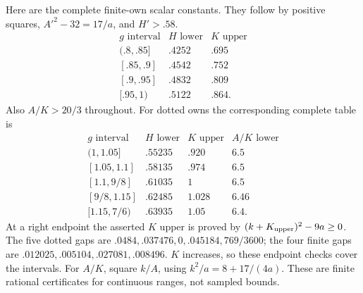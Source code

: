 \documentclass[11pt]{article}
\theoremstyle{definition}
\theoremstyle{remark}
\begin{document}
Here are the complete finite-own scalar constants.
They follow by positive squares, \(A'^2-32=17/a\), and
\(H'>.58\).
\[
\begin{array}{c|c|c}
g\text{ interval}&H\text{ lower}&K\text{ upper}\\ \hline
(.8,.85]&.4252&.695\\
{}[.85,.9]&.4542&.752\\
{}[.9,.95]&.4832&.809\\
{}[.95,1)&.5122&.864 .
\end{array}
\]
Also \(A/K>20/3\) throughout.
For dotted owns the corresponding complete table is
\[
\begin{array}{c|c|c|c}
g\text{ interval}&H\text{ lower}&K\text{ upper}&A/K\text{ lower}\\ \hline
(1,1.05]&.55235&.920&6.5\\
{}[1.05,1.1]&.58135&.974&6.5\\
{}[1.1,9/8]&.61035&1&6.5\\
{}[9/8,1.15]&.62485&1.028&6.46\\
{}[1.15,7/6)&.63935&1.05&6.4 .
\end{array}
\]
At a right endpoint the asserted \(K\) upper is proved by
\((k+K_{\rm upper})^2-9a\geq0\).
The five dotted gaps are
\(.0484,.037476,0,.045184,769/3600\);
the four finite gaps are
\(.012025,.005104,.027081,.008496\).
\(K\) increases, so these endpoint checks cover the intervals.
For \(A/K\), square \(k/A\), using \(k^2/a=8+17/(4a)\).
These are finite rational certificates for continuous ranges,
not sampled bounds.
\end{document}
